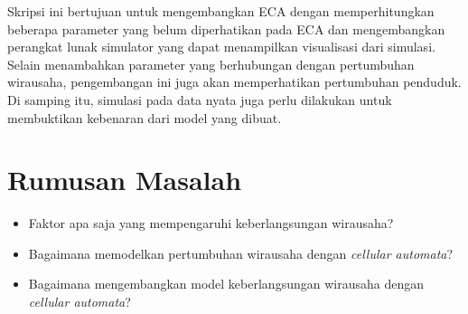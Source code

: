 \documentclass[a4paper,twoside]{article}
\begin{document}
Skripsi ini bertujuan untuk mengembangkan ECA dengan memperhitungkan beberapa parameter yang belum diperhatikan pada ECA dan mengembangkan perangkat lunak simulator yang dapat menampilkan visualisasi dari simulasi. Selain menambahkan parameter yang berhubungan dengan pertumbuhan wirausaha, pengembangan ini juga akan memperhatikan pertumbuhan penduduk. Di samping itu, simulasi pada data nyata juga perlu dilakukan untuk membuktikan kebenaran dari model yang dibuat.








\section{Rumusan Masalah}
\begin{itemize}
	\item Faktor apa saja yang mempengaruhi keberlangsungan wirausaha?
	\item Bagaimana memodelkan pertumbuhan wirausaha dengan \textit{cellular automata}?
	\item Bagaimana mengembangkan model keberlangsungan wirausaha dengan \textit{cellular automata}?
\end{itemize}
\end{document}
